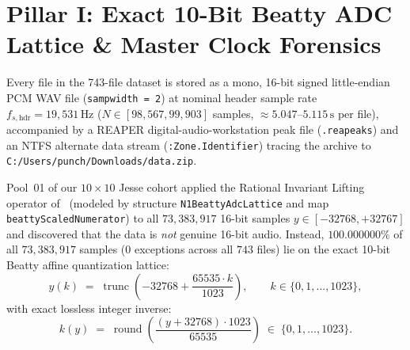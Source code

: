 \documentclass[11pt,letterpaper]{article}
\newcommand{\lean}[1]{\nolinkurl{#1}}
\theoremstyle{definition}
\begin{document}
\section[Pillar I: Exact 10-Bit Beatty ADC Lattice \& Clock Forensics]{Pillar I: Exact 10-Bit Beatty ADC Lattice \& Master Clock Forensics}

Every file in the 743-file dataset is stored as a mono, 16-bit signed little-endian PCM WAV file (\texttt{sampwidth = 2}) at nominal header sample rate $f_{s,\mathrm{hdr}} = 19{,}531\,\text{Hz}$ ($N \in [98{,}567, 99{,}903]$ samples, $\approx 5.047\text{--}5.115\,\text{s}$ per file), accompanied by a REAPER digital-audio-workstation peak file (\texttt{.reapeaks}) and an NTFS alternate data stream (\texttt{:Zone.Identifier}) tracing the archive to \nolinkurl{C:/Users/punch/Downloads/data.zip}.

Pool~01 of our $10\times 10$ Jesse cohort applied the Rational Invariant Lifting operator of~\cite{solidsf_pixelean2026} (modeled by structure \lean{N1BeattyAdcLattice} and map \lean{beattyScaledNumerator}) to all $73{,}383{,}917$ 16-bit samples $y \in [-32768, +32767]$ and discovered that the data is \emph{not} genuine 16-bit audio. Instead, $100.000000\%$ of all $73{,}383{,}917$ samples ($0$ exceptions across all $743$ files) lie on the exact 10-bit Beatty affine quantization lattice:
\begin{equation}\label{eq:beatty_forward}
  y(k) \;=\; \operatorname{trunc}\!\left(-32768 + \frac{65535 \cdot k}{1023}\right), \qquad k \in \{0, 1, \dots, 1023\},
\end{equation}
with exact lossless integer inverse:
\begin{equation}\label{eq:beatty_inverse}
  k(y) \;=\; \operatorname{round}\!\left(\frac{(y + 32768) \cdot 1023}{65535}\right) \;\in\; \{0, 1, \dots, 1023\}.
\end{equation}
\end{document}
